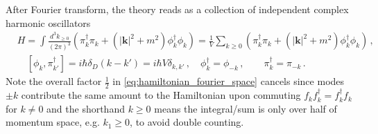 \documentclass[../QFT_main.tex]{subfiles}
\begin{document}
\begin{mytheorem}
%
After Fourier transform, the theory reads as a collection of independent complex harmonic oscillators
\begin{align}\label{eq:kg_hamiltonian_complex_oscillators}
    &H  = \int \frac{d^3 k_{\geq0}}{(2\pi)^3} \left( \pi_k^\dagger\pi_k + (|\mathbf{k}|^2 + m^2) \phi_k^\dagger \phi_{k} \right) = \frac{1}{V}\sum_{k\geq0} \left( \pi_k^\dagger\pi_k + (|\mathbf{k}|^2 + m^2) \phi_k^\dagger \phi_{k} \right)\,,\\
    & \quad [\phi_k,\pi_{k'}^\dagger]=i\hbar \delta_D(k-k')= i\hbar V \delta_{k,k'}\,,\quad \phi_k^\dagger = \phi_{-k}\,,\qquad \pi_k^\dagger = \pi_{-k}\,.
\end{align}
Note the overall factor $\frac{1}{2}$ in \eqref{eq:hamiltonian_fourier_space} cancels since modes $\pm k$ contribute the same amount to the Hamiltonian upon commuting $f_kf_k^\dagger=f_k^\dagger f_k$ for $k\neq0$ and the shorthand $k\geq0$ means the integral/sum is only over half of momentum space, e.g. $k_1\geq0$, to avoid double counting.


\end{mytheorem}
\end{document}
